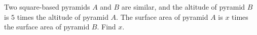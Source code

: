 Two square-based pyramids $A$ and $B$ are similar, and the altitude of pyramid $B$ is $5$ times the altitude of pyramid $A$. The surface area of pyramid $A$ is $x$ times the surface area of pyramid $B$. Find $x$.
